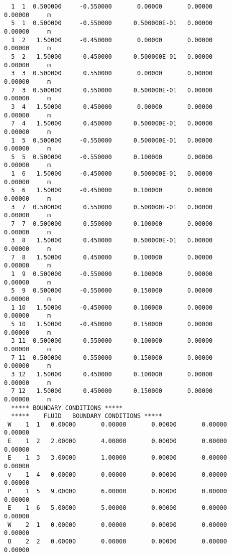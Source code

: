 \begin{verbatim}
  1  1  0.500000     -0.550000       0.00000       0.00000       0.00000     m
  5  1  0.500000     -0.550000      0.500000E-01   0.00000       0.00000     m
  1  2   1.50000     -0.450000       0.00000       0.00000       0.00000     m
  5  2   1.50000     -0.450000      0.500000E-01   0.00000       0.00000     m
  3  3  0.500000      0.550000       0.00000       0.00000       0.00000     m
  7  3  0.500000      0.550000      0.500000E-01   0.00000       0.00000     m
  3  4   1.50000      0.450000       0.00000       0.00000       0.00000     m
  7  4   1.50000      0.450000      0.500000E-01   0.00000       0.00000     m
  1  5  0.500000     -0.550000      0.500000E-01   0.00000       0.00000     m
  5  5  0.500000     -0.550000      0.100000       0.00000       0.00000     m
  1  6   1.50000     -0.450000      0.500000E-01   0.00000       0.00000     m
  5  6   1.50000     -0.450000      0.100000       0.00000       0.00000     m
  3  7  0.500000      0.550000      0.500000E-01   0.00000       0.00000     m
  7  7  0.500000      0.550000      0.100000       0.00000       0.00000     m
  3  8   1.50000      0.450000      0.500000E-01   0.00000       0.00000     m
  7  8   1.50000      0.450000      0.100000       0.00000       0.00000     m
  1  9  0.500000     -0.550000      0.100000       0.00000       0.00000     m
  5  9  0.500000     -0.550000      0.150000       0.00000       0.00000     m
  1 10   1.50000     -0.450000      0.100000       0.00000       0.00000     m
  5 10   1.50000     -0.450000      0.150000       0.00000       0.00000     m
  3 11  0.500000      0.550000      0.100000       0.00000       0.00000     m
  7 11  0.500000      0.550000      0.150000       0.00000       0.00000     m
  3 12   1.50000      0.450000      0.100000       0.00000       0.00000     m
  7 12   1.50000      0.450000      0.150000       0.00000       0.00000     m
  ***** BOUNDARY CONDITIONS *****
  *****    FLUID   BOUNDARY CONDITIONS *****
 W    1  1   0.00000       0.00000       0.00000       0.00000       0.00000    
 E    1  2   2.00000       4.00000       0.00000       0.00000       0.00000    
 E    1  3   3.00000       1.00000       0.00000       0.00000       0.00000    
 v    1  4   0.00000       0.00000       0.00000       0.00000       0.00000    
 P    1  5   9.00000       6.00000       0.00000       0.00000       0.00000    
 E    1  6   5.00000       5.00000       0.00000       0.00000       0.00000    
 W    2  1   0.00000       0.00000       0.00000       0.00000       0.00000    
 O    2  2   0.00000       0.00000       0.00000       0.00000       0.00000    

\end{verbatim}
